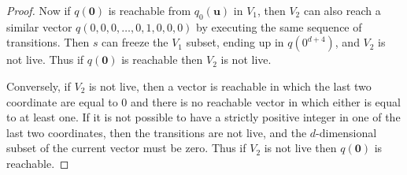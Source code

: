 \begin{proof}
Now if $q(\textbf{0})$ is reachable from $q_0(\textbf{u})$ in $V_1$, then $V_2$ can also reach a similar
vector $q(0,0,0,\ldots, 0, 1,0,0,0)$ by executing the same sequence of transitions.
Then $s$ can freeze the $V_1$ subset,
ending up in $q(0^{d+4})$, and $V_2$ is not live.
Thus if $q(\textbf{0})$ is reachable then $V_2$ is not live.


Conversely, if $V_2$ is not live, then a vector is reachable in which the last two coordinate are equal to $0$ and there is no reachable vector in which either is equal to at least one.
If it is not possible to have a strictly positive integer in one of the last two coordinates, then the transitions are not live, and the
$d$-dimensional subset of the current vector must be zero.
Thus if $V_2$ is not live then 
$q(\textbf{0})$ is reachable.
\end{proof}








